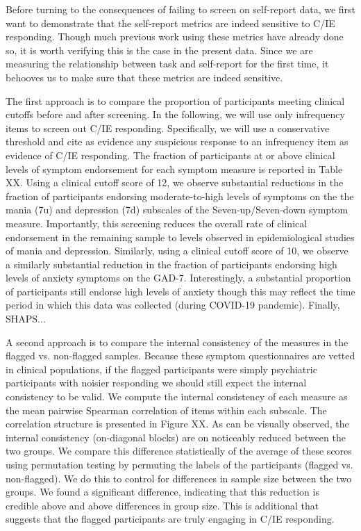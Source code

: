 \documentclass[a4paper,notitlepage,12pt]{article}
\begin{document}
Before turning to the consequences of failing to screen on self-report data, we first want to demonstrate that the self-report metrics are indeed sensitive to C/IE responding. Though much previous work using these metrics have already done so, it is worth verifying this is the case in the present data. Since we are measuring the relationship between task and self-report for the first time, it behooves us to make sure that these metrics are indeed sensitive.

The first approach is to compare the proportion of participants meeting clinical cutoffs before and after screening. In the following, we will use only infrequency items to screen out C/IE responding. Specifically, we will use a conservative threshold and cite as evidence any suspicious response to an infrequency item as evidence of C/IE responding. The fraction of participants at or above clinical levels of symptom endorsement for each symptom measure is reported in Table XX. Using a clinical cutoff score of 12, we observe substantial reductions in the fraction of participants endorsing moderate-to-high levels of symptoms on the the mania (7u) and depression (7d) subscales of the Seven-up/Seven-down symptom measure. Importantly, this screening reduces the overall rate of clinical endorsement in the remaining sample to levels observed in epidemiological studies of mania and depression. Similarly, using a clinical cutoff score of 10, we observe a similarly substantial reduction in the fraction of participants endorsing high levels of anxiety symptoms on the GAD-7. Interestingly, a substantial proportion of participants still endorse high levels of anxiety though this may reflect the time period in which this data was collected (during COVID-19 pandemic). Finally, SHAPS...

A second approach is to compare the internal consistency of the measures in the flagged vs. non-flagged samples. Because these symptom questionnaires are vetted in clinical populations, if the flagged participants were simply psychiatric participants with noisier responding we should still expect the internal consistency to be valid. We compute the internal consistency of each measure as the mean pairwise Spearman correlation of items within each subscale. The correlation structure is presented in Figure XX. As can be visually observed, the internal consistency (on-diagonal blocks) are on noticeably reduced between the two groups. We compare this difference statistically of the average of these scores using permutation testing by permuting the labels of the participants (flagged vs. non-flagged). We do this to control for differences in sample size between the two groups. We found a significant difference, indicating that this reduction is credible above and above differences in group size. This is additional that suggests that the flagged participants are truly engaging in C/IE responding. 
\end{document}
